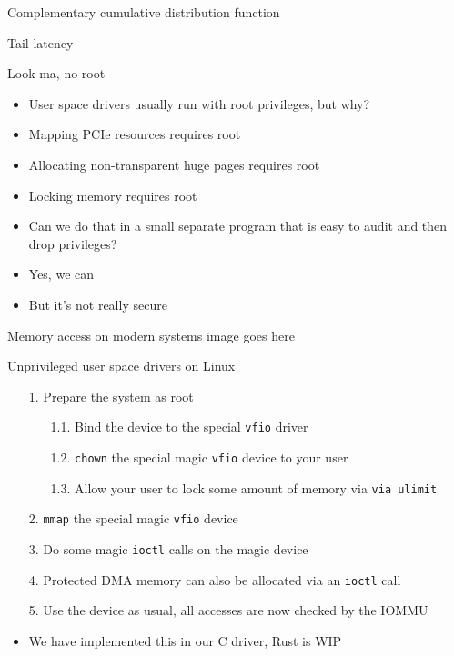 \documentclass[NET,english,aspectratio=169,notitleframe]{tumbeamer}
\begin{document}
\begin{frame}{Complementary cumulative distribution function}
\end{frame}

\begin{frame}{Tail latency}
\end{frame}


\begin{frame}{Look ma, no root}
\begin{itemize}
\item User space drivers usually run with root privileges, but why?
\pause
\vspace{1em}
\item Mapping PCIe resources requires root
\item Allocating non-transparent huge pages requires root
\item Locking memory requires root
\vspace{1em}
\item Can we do that in a small separate program that is easy to audit and then drop privileges?
\pause
\item Yes, we can
\item But it's not really secure
\end{itemize}
\end{frame}

\begin{frame}{Memory access on modern systems}
image goes here
\end{frame}

\begin{frame}{Unprivileged user space drivers on Linux}
\begin{itemize}
\item[1.] Prepare the system as root
\begin{itemize}
\item[1.1.] Bind the device to the special \texttt{vfio} driver
\item[1.2.] \texttt{chown} the special magic \texttt{vfio} device to your user
\item[1.3.] Allow your user to lock some amount of memory via \texttt{via ulimit}
\end{itemize}
\pause
\item[2.] \texttt{mmap} the special magic \texttt{vfio} device
\item[3.] Do some magic \texttt{ioctl} calls on the magic device
\item[4.] Protected DMA memory can also be allocated via an \texttt{ioctl} call
\item[5.] Use the device as usual, all accesses are now checked by the IOMMU
\vspace{1em}
\pause
\item We have implemented this in our C driver, Rust is WIP
\end{itemize}
\end{frame}
\end{document}

